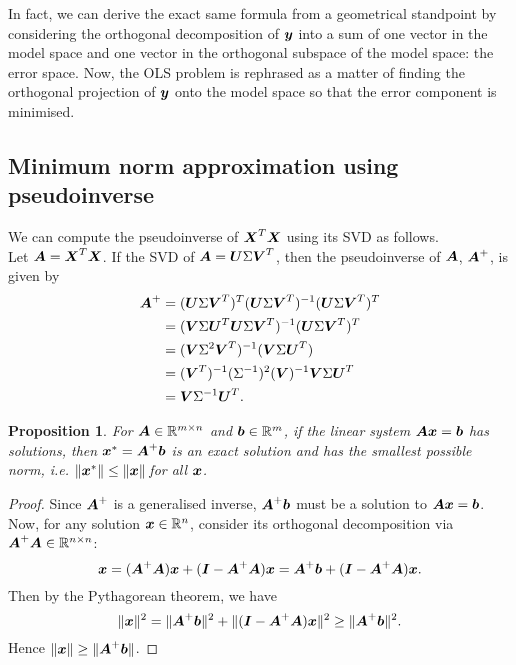 \documentclass[12pt]{article}
\newtheorem{prop}{Proposition}[section]
\newcommand{\Sg}{\Sigma}
\begin{document}
	In fact, we can derive the exact same formula from a geometrical standpoint by considering the orthogonal decomposition of $\boldsymbol{y}$ into a sum of one vector in the model space and one vector in the orthogonal subspace of the model space: the error space. Now, the OLS problem is rephrased as a matter of finding the orthogonal projection of $\boldsymbol{y}$ onto the model space so that the error component is minimised.
	\subsection{Minimum norm approximation using pseudoinverse\label{sec:append2}}
	We can compute the pseudoinverse of $\boldsymbol{X}^T\boldsymbol{X}$ using its SVD as follows.\\
	
	Let $\boldsymbol{A}=\boldsymbol{X}^T\boldsymbol{X}$. If the SVD of $\bmA=\bmU\Sg\bmV^T$, then the pseudoinverse of $\boldsymbol{A}$, $\boldsymbol{A}^+$, is given by
	\begin{align*}
		\bmA^+&=(\bmU\Sg\bmV^T)^T(\bmU\Sg\bmV^T)^{-1}(\bmU\Sg\bmV^T)^T\\
		&=(\bmV\Sg\bmU^T\bmU\Sg\bmV^T)^{-1}(\bmU\Sg\bmV^T)^T\\
		&=(\bmV\Sg^2\bmV^T)^{-1}(\bmV\Sg\bmU^T)\\
		&=(\bmV^T)^{-1}(\Sg^{-1})^2(\bmV)^{-1}\bmV\Sg\bmU^T\\
		&=\bmV\Sg^{-1}\bmU^T.
	\end{align*}
	
	\begin{prop}
		For $\bmA\in\RR^{m\times n}$ and $\bmb\in\RR^m$, if the linear system $\boldsymbol{A}\boldsymbol{x}=\boldsymbol{b}$ has solutions, then $\boldsymbol{x}^*=\boldsymbol{A}^+\boldsymbol{b}$ is an exact solution and has the smallest possible norm, i.e. $\|\boldsymbol{x}^*\|\leq\|\boldsymbol{x}\|\, $for all $\boldsymbol{x}$.
	\end{prop}
	\begin{proof}
		Since $\boldsymbol{A}^+$ is a generalised inverse, $\boldsymbol{A}^+\boldsymbol{b}$ must be a solution to $\boldsymbol{A}\boldsymbol{x}=\boldsymbol{b}$. Now, for any solution $\bmx\in\Rn$, consider its orthogonal decomposition via $\bmA^+\bmA\in\RR^{n\times n}$:
		$$\boldsymbol{x}=(\boldsymbol{A}^+\boldsymbol{A})\boldsymbol{x}+(\boldsymbol{I}-\boldsymbol{A}^+\boldsymbol{A})\boldsymbol{x}=\boldsymbol{A}^+\boldsymbol{b}+(\boldsymbol{I}-\boldsymbol{A}^+\boldsymbol{A})\boldsymbol{x}.$$
		Then by the Pythagorean theorem, we have
		$$\|\boldsymbol{x}\|^2=\|\boldsymbol{A}^+\boldsymbol{b}\|^2+\|(\boldsymbol{I}-\boldsymbol{A}^+\boldsymbol{A})\boldsymbol{x}\|^2\geq \|\boldsymbol{A}^+\boldsymbol{b}\|^2.$$
		Hence $\|\boldsymbol{x}\|\geq\|\boldsymbol{A}^+\boldsymbol{b}\|$.
	\end{proof}
	\pagebreak
\end{document}

